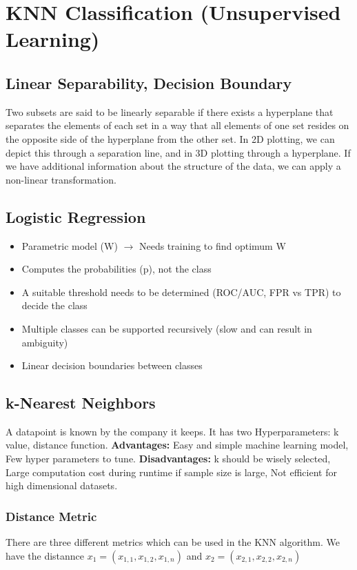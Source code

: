 \section{KNN Classification (Unsupervised Learning)}
\subsection{Linear Separability, Decision Boundary}
Two subsets are said to be linearly separable if there exists a hyperplane that separates the elements of each set in a way that all elements of one set resides on the opposite side of the hyperplane from the other set. In 2D plotting, we can depict this through a separation line, and in 3D plotting through a hyperplane. If we have additional information about the structure of the data, we can apply a non-linear transformation.

\subsection{Logistic Regression}
\begin{itemize}[topsep=0pt]
	\itemsep -0.5em
	\item Parametric model (W) $\rightarrow$ Needs training to find optimum W
	\item Computes the probabilities (p), not the class
	\item A suitable threshold needs to be determined (ROC/AUC, FPR vs TPR) to decide the class
	\item Multiple classes can be supported recursively (slow and can result in ambiguity)
	\item Linear decision boundaries between classes
\end{itemize}

\subsection{k-Nearest Neighbors}
A datapoint is known by the company it keeps. It has two Hyperparameters: k value, distance function. \textbf{Advantages:} Easy and simple machine learning model,  Few  hyper parameters to tune. \textbf{Disadvantages:} k should be wisely selected,  Large computation cost during runtime if sample size is large, Not efficient for high dimensional datasets.

\subsubsection{Distance Metric}
There are three different metrics which can be used in the KNN algorithm. We have the distannce $x_{1}=(x_{1,1},x_{1,2},x_{1,n})$ and $x_{2}=(x_{2,1},x_{2,2},x_{2,n})$

